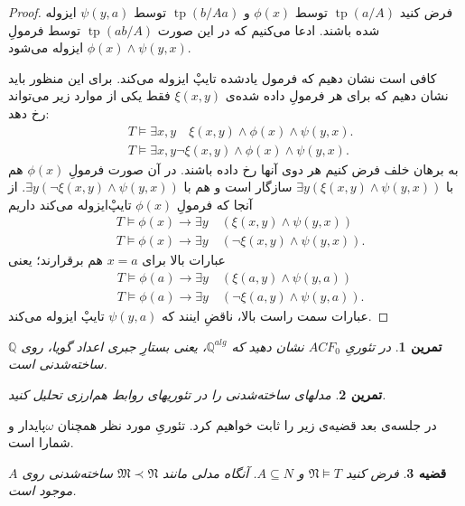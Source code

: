 \documentclass[12pt,a4paper]{report}
\theoremstyle{colorhead}
\newtheorem{thm}{قضیه}
\newtheorem{tam}[thm]{تمرین}
\DeclareMathOperator{\tp}{tp}
\begin{document}
	\begin{proof}
	فرض کنید
$\tp(a/A)$
توسط
$\phi(x)$
و 
$\tp(b/Aa)$
توسط
$\psi(y,a)$
ایزوله شده باشند. ادعا می‌کنیم که در این صورت
$\tp(ab/A)$
توسط فرمولِ
$\phi(x)\wedge\psi(y,x)$
ایزوله می‌شود.
\par
کافی است نشان دهیم که فرمول یادشده تایپْ ایزوله می‌کند. برای این منظور باید نشان دهیم که برای هر فرمولِ داده شده‌ی
$\xi(x,y)$
فقط یکی از موارد زیر می‌تواند رخ دهد:
\begin{align*}
& T\models \exists x,y \quad \xi(x,y)\wedge \phi(x)\wedge\psi(y,x).
\\
& T \models \exists x,y \neg \xi(x,y)\wedge \phi(x)\wedge \psi(y,x).
\end{align*}
	به برهان خلف فرض کنیم هر دوی آنها رخ داده باشند. در آن صورت فرمولِ
	$\phi(x)$
	هم با
	$\exists y(\xi(x,y)\wedge \psi(y,x))$
	سازگار است و هم با
	$\exists y(\neg \xi(x,y)\wedge \psi(y,x))$.
	از آنجا که فرمولِ
	$\phi(x)$
	تایپْ‌ایزوله می‌کند داریم
	\begin{align*}
	& T\models \phi(x)\to \exists y\quad
(\xi(x,y)\wedge \psi(y,x))\\
	& T\models \phi(x)\to  
	\exists y\quad (\neg \xi(x,y)\wedge \psi(y,x)).
	\end{align*}
	عبارات بالا برای 
	$x=a$
	هم برقرارند؛ یعنی
		\begin{align*}
	& T\models \phi(a)\to \exists y\quad
(\xi(a,y)\wedge \psi(y,a))\\
	& T\models \phi(a)\to  
	\exists y\quad (\neg \xi(a,y)\wedge \psi(y,a)).
	\end{align*}
	عبارات سمت راست بالا، ناقضِ‌ اینند که
	$\psi(y,a)$
	تایپْ ایزوله می‌کند.
	\end{proof}
\begin{tam}
در تئوریِ
$ACF_0$
نشان دهید که 
$\mathbb{Q}^{alg}$، 
یعنی بستارِ جبری اعداد گویا، روی
$\mathbb{Q}$
ساخته‌شدنی است.
\end{tam}
\begin{tam}
مدلهای ساخته‌شدنی را در تئوریهای روابط هم‌ارزی تحلیل کنید. 
\end{tam}
در جلسه‌ی بعد قضیه‌ی زیر را ثابت خواهیم کرد.
تئوریِ مورد نظر همچنان
$\omega$پایدار
و شمارا است. 
\begin{thm}
فرض کنید
$ \mathfrak{N}\models T$
و
$A\subseteq N$.
آنگاه 
مدلی مانند
$\mathfrak{M}\prec \mathfrak{N}$
ساخته‌شدنی روی
$A$
موجود است. 
\end{thm}
\pagebreak 
\end{document}
